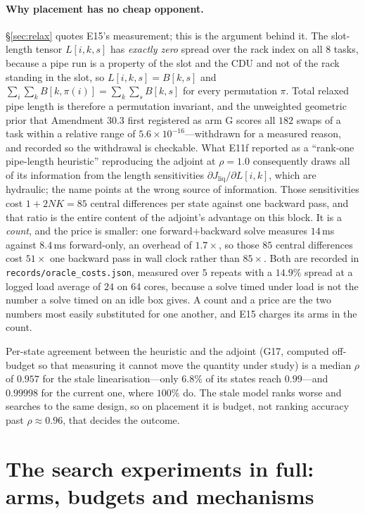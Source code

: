 \documentclass{article}
\newcommand{\Jliq}{J_{\mathrm{liq}}}
\begin{document}
\paragraph{Why placement has no cheap opponent.}  \S\ref{sec:relax} quotes E15's measurement; this
is the argument behind it.  The slot-length tensor $L[i,k,s]$ has \emph{exactly zero} spread over
the rack index on all $8$ tasks, because a pipe run is a property of the slot and the CDU
and not of the rack standing in the slot, so $L[i,k,s] = B[k,s]$ and
$\sum_i\sum_k B[k,\pi(i)] = \sum_k\sum_s B[k,s]$ for every permutation $\pi$.  Total relaxed pipe
length is therefore a permutation invariant, and the unweighted geometric prior that Amendment
30.3 first registered as arm G scores all $182$ swaps of a task within a relative range of
$5.6\times10^{-16}$---withdrawn for a measured reason, and recorded so the withdrawal is
checkable.  What E11f reported as a ``rank-one pipe-length heuristic'' reproducing the adjoint at
$\rho = 1.0$ consequently draws all of its information from the length sensitivities
$\partial\Jliq/\partial L[i,k]$, which are hydraulic; the name points at the wrong source of
information.  Those sensitivities cost $1 + 2NK = 85$ central differences per state against
one backward pass, and that ratio is the entire content of the adjoint's advantage on this block.
It is a \emph{count}, and the price is smaller: one forward+backward solve measures $14$\,ms
against $8.4$\,ms forward-only, an overhead of $1.7\times$, so those $85$ central differences cost
$51\times$ one backward pass in wall clock rather than $85\times$.  Both are recorded in
\texttt{records/oracle\_costs.json}, measured over $5$ repeats with a $14.9\%$ spread at a logged
load average of $24$ on $64$ cores, because a solve timed under load is not the number a solve
timed on an idle box gives.  A count and a price are the two numbers most easily substituted for
one another, and E15 charges its arms in the count.

Per-state agreement between the heuristic and the adjoint (G17, computed off-budget so that
measuring it cannot move the quantity under study) is a median $\rho$ of $0.957$ for the stale
linearisation---only $6.8\%$ of its states reach $0.99$---and $0.99998$ for the current
one, where $100\%$ do.  The stale model ranks worse and searches to the same design, so on
placement it is budget, not ranking accuracy past $\rho \approx 0.96$, that decides the outcome.

\section{The search experiments in full: arms, budgets and mechanisms}
\label{app:search}
\end{document}
